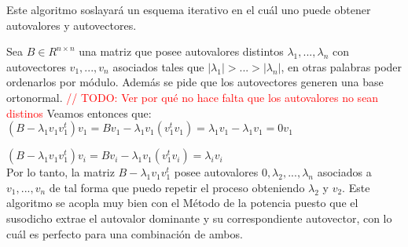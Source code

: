 Este algoritmo soslayar\'a un esquema iterativo en el cu\'al uno puede obtener autovalores y autovectores.

Sea $B \in R^{n \times n}$ una matriz que posee autovalores distintos $\lambda_{1}, ..., \lambda_{n}$ con autovectores $v_{1}, ..., v_{n}$ asociados tales que $\vert \lambda_{1} \vert > ... > \vert \lambda_{n} \vert$, en otras palabras poder ordenarlos por m\'odulo. Adem\'as se pide que los autovectores generen una base ortonormal. \textcolor{red}{// TODO: Ver por qu\'e no hace falta que los autovalores no sean distinos} Veamos entonces que: \\

$(B - \lambda_{1}v_{1}v_{1}^{t})v_{1} = Bv_{1} - \lambda_{1}v_{1}(v_{1}^{t}v_{1}) = \lambda_{1}v_{1} - \lambda_{1}v_{1} = 0v_{1}$

$(B - \lambda_{1}v_{1}v_{1}^{t})v_{i} = Bv_{i} - \lambda_{1}v_{1}(v_{1}^{t}v_{i}) = \lambda_{i}v_{i}$ \\

Por lo tanto, la matriz $B - \lambda_{1}v_{1}v_{1}^{t}$ posee autovalores $0, \lambda_{2}, ..., \lambda_{n}$ asociados a $v_{1}, ..., v_{n}$ de tal forma que puedo repetir el proceso obteniendo $\lambda_{2}$ y $v_{2}$. Este algoritmo se acopla muy bien con el M\'etodo de la potencia puesto que el susodicho extrae el autovalor dominante y su correspondiente autovector, con lo cu\'al es perfecto para una combinaci\'on de ambos.